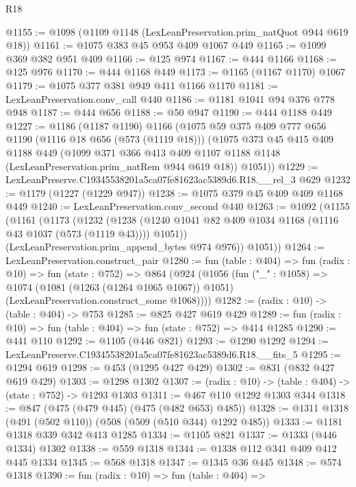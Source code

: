 \begin{lexlean}{R18}
\begin{coremodule}
@1155 := @1098 (@1109 @1148 (LexLeanPreservation.prim_natQuot @944 @619 @18))
@1161 := @1075 @383 @45 @953 @409 @1067 @449
@1165 := @1099 @369 @382 @951 @409
@1166 := @125 @974
@1167 := @444 @1166
@1168 := @125 @976
@1170 := @444 @1168 @449
@1173 := @1165 (@1167 @1170) @1067
@1179 := @1075 @377 @381 @949 @411 @1166 @1170
@1181 := LexLeanPreservation.conv_call @440
@1186 := @1181 @1041 @94 @376 @778 @948
@1187 := @444 @656
@1188 := @50 @947
@1190 := @444 @1188 @449
@1227 := @1186
    (@1187 @1190)
    @1166
    (@1075
      @59
      @375
      @409
      @777
      @656
      @1190
      (@1116 @18 @656 (@573 (@1119 @18)))
      (@1075
        @373
        @45
        @415
        @409
        @1188
        @449
        (@1099
          @371
          @366
          @413
          @409
          @1107
          @1188
          @1148
          (LexLeanPreservation.prim_natRem @944 @619 @18))
        @1051))
@1229 := LexLeanPreserve.C19345538201a5ca07fe81623ac5389d6.R18.__rel_3 @629
@1232 := @1179 (@1227 (@1229 @947))
@1238 := @1075 @379 @45 @409 @409 @1168 @449
@1240 := LexLeanPreservation.conv_second @440
@1263 := @1092
    (@1155
      (@1161
        (@1173
          (@1232
            (@1238 (@1240 @1041 @82 @409 @1034 @1168 (@1116 @43 @1037 (@573 (@1119 @43)))) @1051))
          (LexLeanPreservation.prim_append_bytes @974 @976))
        @1051))
@1264 := LexLeanPreservation.construct_pair
@1280 := fun (table : @404) =>
  fun (radix : @10) =>
  fun (state : @752) =>
  @864
    (@924
      (@1056
        (fun ("_" : @1058) =>
        @1074
          (@1081 (@1263 (@1264 @1065 @1067)) @1051)
          (LexLeanPreservation.construct_some @1068))))
@1282 := (radix : @10) -> (table : @404) -> @753
@1285 := @825 @427 @619 @429
@1289 := fun (radix : @10) => fun (table : @404) => fun (state : @752) => @414 @1285
@1290 := @441 @110
@1292 := @1105 (@446 @821)
@1293 := @1290 @1292
@1294 := LexLeanPreserve.C19345538201a5ca07fe81623ac5389d6.R18.__fits_5
@1295 := @1294 @619
@1298 := @453 (@1295 @427 @429)
@1302 := @831 (@832 @427 @619 @429)
@1303 := @1298 @1302
@1307 := (radix : @10) -> (table : @404) -> (state : @752) -> @1293 @1303
@1311 := @467 @110 @1292 @1303 @344
@1318 := @847 (@475 (@479 @445) (@475 (@482 @653) @485))
@1328 := @1311 @1318 (@491 (@502 @110)) (@508 (@509 (@510 @344) @1292 @485))
@1333 := @1181 @1318 @339 @342 @413 @1285
@1334 := @1105 @821
@1337 := @1333 (@446 @1334) @1302
@1338 := @559 @1318
@1344 := @1338 @112 @341 @409 @412 @445 @1334
@1345 := @568 @1318
@1347 := @1345 @36 @445
@1348 := @574 @1318
@1390 := fun (radix : @10) =>
  fun (table : @404) =>

\end{coremodule}
\end{lexlean}
